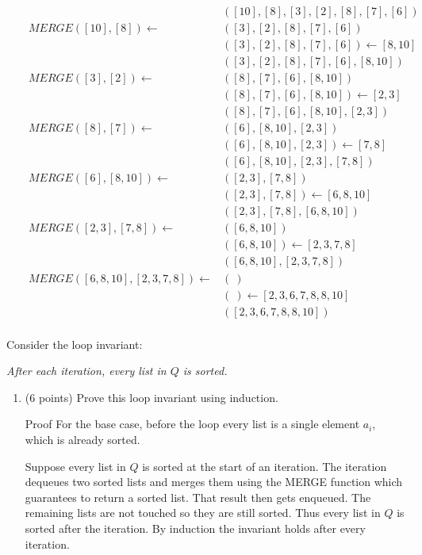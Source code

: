 \documentclass[10pt,letterpaper,unboxed,cm]{article}
\begin{document}
\begin{enumerate}
\begin{align*}
&&&([10],[8],[3],[2],[8],[7],[6])&\\
&&MERGE([10],[8])\leftarrow&([3],[2],[8],[7],[6])&\\
&&&([3],[2],[8],[7],[6])\leftarrow [8,10]\\
&&&([3],[2],[8],[7],[6],[8,10])&\\
&&MERGE([3],[2])\leftarrow&([8],[7],[6],[8,10])&\\
&&&([8],[7],[6],[8,10])\leftarrow [2,3]\\
&&&([8],[7],[6],[8,10],[2,3])&\\
&&MERGE([8],[7])\leftarrow&([6],[8,10],[2,3])&\\
&&&([6],[8,10],[2,3])\leftarrow [7,8]\\
&&&([6],[8,10],[2,3],[7,8])&\\
&&MERGE([6],[8,10])\leftarrow&([2,3],[7,8])&\\
&&&([2,3],[7,8])\leftarrow [6,8,10]\\
&&&([2,3],[7,8],[6,8,10])&\\
&&MERGE([2,3],[7,8])\leftarrow&([6,8,10])&\\
&&&([6,8,10])\leftarrow [2,3,7,8]\\
&&&([6,8,10],[2,3,7,8])&\\
&&MERGE([6,8,10],[2,3,7,8])\leftarrow&(~)&\\
&&&(~)\leftarrow [2,3,6,7,8,8,10]\\
&&&([2,3,6,7,8,8,10])&\\
\end{align*}

Consider the loop invariant:
\begin{center}
\emph{After each iteration, every list in $Q$ is sorted.}
\end{center}

\begin{enumerate}
\item (6 points)
Prove this loop invariant using induction.
\begin{frame}{Proof}
    For the base case, before the loop every list is a single element \(a_i\), which is already sorted.

    Suppose every list in \(Q\) is sorted at the start of an iteration. The iteration dequeues two sorted lists and merges them using the MERGE function which guarantees to return a sorted list. That result then gets enqueued. The remaining lists are not touched so they are still sorted. Thus every list in \(Q\) is sorted after the iteration. By induction the invariant holds after every iteration.
\end{frame}


\end{enumerate}
\end{enumerate}
\end{document}
